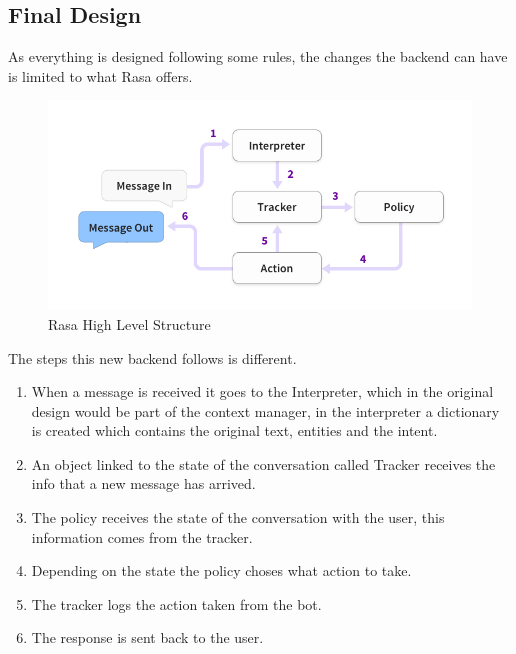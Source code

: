 \subsection{Final Design}\label{sec:chap4_fin_des_fron}

As everything is designed following some rules, the changes the backend can have is limited to what Rasa offers.

\begin{center}
	\begin{figure}[h!]
		\centering
		\includegraphics[scale=0.65]{./images/4-rasa-message-processing}
		\caption{Rasa High Level Structure}
		\label{4_rasa_message_processing}
	\end{figure}
\end{center}

The steps this new backend follows is different.

\begin{enumerate}
	\item {When a message is received it goes to the Interpreter, which in the original design would be part of the context manager, in the interpreter a dictionary is created which contains the original text, entities and the intent.}
	\item {An object linked to the state of the conversation called Tracker receives the info that a new message has arrived.}
	\item {The policy receives the state of the conversation with the user, this information comes from the tracker.}
	\item {Depending on the state the policy choses what action to take.}
	\item {The tracker logs the action taken from the bot.}
	\item {The response is sent back to the user.\cite{rasa-arch}}
\end{enumerate}

